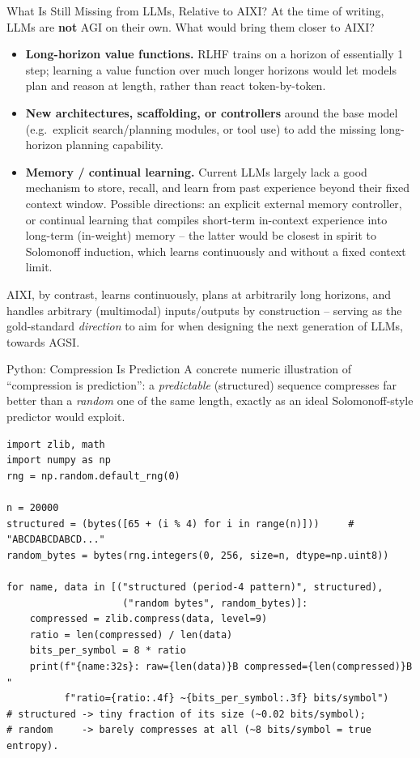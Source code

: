 \documentclass[aspectratio=169,10pt]{beamer}
\begin{document}
\begin{frame}{What Is Still Missing from LLMs, Relative to AIXI?}
  At the time of writing, LLMs are \textbf{not} AGI on their own. What would
  bring them closer to AIXI?
  \begin{itemize}
    \item \textbf{Long-horizon value functions.} RLHF trains on a horizon
      of essentially 1 step; learning a value function over much longer
      horizons would let models plan and reason at length, rather than
      react token-by-token.
    \item \textbf{New architectures, scaffolding, or controllers} around
      the base model (e.g.\ explicit search/planning modules, or tool use)
      to add the missing long-horizon planning capability.
    \item \textbf{Memory / continual learning.} Current LLMs largely lack a
      good mechanism to store, recall, and learn from past experience
      beyond their fixed context window. Possible directions: an explicit
      external memory controller, or continual learning that compiles
      short-term in-context experience into long-term (in-weight) memory --
      the latter would be closest in spirit to Solomonoff induction, which
      learns continuously and without a fixed context limit.
  \end{itemize}
  AIXI, by contrast, learns continuously, plans at arbitrarily long
  horizons, and handles arbitrary (multimodal) inputs/outputs by
  construction -- serving as the gold-standard \emph{direction} to aim for
  when designing the next generation of LLMs, towards AGSI.
\end{frame}

\begin{frame}[fragile]{Python: Compression Is Prediction}
  A concrete numeric illustration of ``compression is prediction'': a
  \emph{predictable} (structured) sequence compresses far better than a
  \emph{random} one of the same length, exactly as an ideal Solomonoff-style
  predictor would exploit.
  \begin{lstlisting}[style=pycode]
import zlib, math
import numpy as np
rng = np.random.default_rng(0)

n = 20000
structured = (bytes([65 + (i % 4) for i in range(n)]))     # "ABCDABCDABCD..."
random_bytes = bytes(rng.integers(0, 256, size=n, dtype=np.uint8))

for name, data in [("structured (period-4 pattern)", structured),
                    ("random bytes", random_bytes)]:
    compressed = zlib.compress(data, level=9)
    ratio = len(compressed) / len(data)
    bits_per_symbol = 8 * ratio
    print(f"{name:32s}: raw={len(data)}B compressed={len(compressed)}B "
          f"ratio={ratio:.4f} ~{bits_per_symbol:.3f} bits/symbol")
# structured -> tiny fraction of its size (~0.02 bits/symbol);
# random     -> barely compresses at all (~8 bits/symbol = true entropy).
  \end{lstlisting}
\end{frame}
\end{document}
